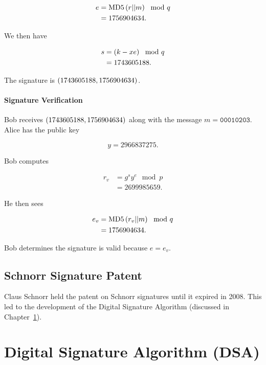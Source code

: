 \begin{example}
\begin{align}
    e &= \text{MD5{}}\left( r||m \right) \mod q \nonumber\\
        &= 1756904634.
\end{align}

\noindent
We then have

\begin{align}
    s &= \left( k - xe \right) \mod q \nonumber\\
        &= 1743605188.
\end{align}

\noindent
The signature is $\left( 1743605188, 1756904634 \right)$.

\paragraph{Signature Verification}
Bob receives $\left( 1743605188, 1756904634 \right)$
along with the message $m = \texttt{00010203}$.
Alice has the public key

\begin{equation}
    y = 2966837275.
\end{equation}

\noindent
Bob computes

\begin{align}
    r_{v} &= g^{s}y^{e} \mod p \nonumber\\
        &= 2699985659.
\end{align}

\noindent
He then sees

\begin{align}
    e_{v} &= \text{MD5{}}\left( r_{v}||m \right) \mod q \nonumber\\
        &= 1756904634.
\end{align}

\noindent
Bob determines the signature is valid because $e = e_{v}$.
\end{example}

\subsection{Schnorr Signature Patent}

Claus Schnorr held the patent on Schnorr signatures until it expired in 2008.
This led to the development of the Digital Signature Algorithm
(discussed in Chapter~\ref{sec:signatures_dsa}).



\section{Digital Signature Algorithm (DSA)}
\label{sec:signatures_dsa}

